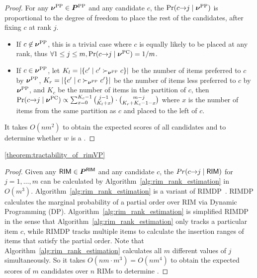 \begin{proof}
  For any $\bm{\nu}^{\text{PP}} \in \bm{P}^{\text{PP}}$ and any candidate $c$, the $\Pr(c {\rightarrow} j \mid \bm{\nu}^{\text{PP}})$ is proportional to the degree of freedom to place the rest of the candidates, after fixing $c$ at rank $j$.

 \begin{itemize}
     \item If $c \not\in \bm{\nu}^{\text{PP}}$, this is a trivial case where $c$ is equally likely to be placed at any rank, thus $\forall 1 \leq j \leq m, \Pr(c {\rightarrow} j \mid \bm{\nu}^{\text{PC}}) = 1/m$.
     \item If $c \in \bm{\nu}^{\text{PP}}$, let $K_l = |\{ c' \mid c' \succ_{\bm{\nu}^{\text{PP}}} c \}|$ be the number of items preferred to $c$ by $\bm{\nu}^{\text{PP}}$, $K_r = |\{ c' \mid c \succ_{\bm{\nu}^{\text{PP}}} c' \}|$ be the number of items less preferred to $c$ by $\bm{\nu}^{\text{PP}}$, and $K_c$ be the number of items in the partition of $c$, then $\Pr(c {\rightarrow} j \mid \bm{\nu}^{\text{PC}}) \propto \sum_{x=0}^{K_c - 1} \binom{j-1}{K_l + x} \cdot \binom{m - j}{K_r + K_c - 1 - x}$ where $x$ is the number of items from the same partition as $c$ and placed to the left of $c$.
   \end{itemize}

  It takes $O(nm^2)$ to obtain the expected scores of all candidates and to determine whether $w$ is a \mew.
\end{proof}

\begin{reptheorem}{\ref{theorem:tractability_of_rimVP}}
  \theoremTractabilityOfRIM
\end{reptheorem}

\begin{proof}
    Given any $\mathsf{RIM} \in \bm{P}^{\mathsf{RIM}}$ and any candidate $c$, the $Pr(c {\rightarrow} j \mid \mathsf{RIM})$ for $j=1,\ldots,m$ can be calculated by Algorithm~\ref{alg:rim_rank_estimation} in $O(m^3)$.
    Algorithm~\ref{alg:rim_rank_estimation} is a variant of RIMDP~\cite{DBLP:conf/aaai/KenigIPKS18}.
    RIMDP calculates the marginal probability of a partial order over RIM via Dynamic Programming (DP).
    Algorithm~\ref{alg:rim_rank_estimation} is simplified RIMDP in the sense that Algorithm~\ref{alg:rim_rank_estimation} only tracks a particular item $c$, while RIMDP tracks multiple items to calculate the insertion ranges of items that satisfy the partial order.
    Note that Algorithm~\ref{alg:rim_rank_estimation} calculates all $m$ different values of $j$ simultaneously.
    So it takes $O(nm \cdot m^3) = O(nm^4)$ to obtain the expected scores of $m$ candidates over $n$ RIMs to determine \mew.
\end{proof}

